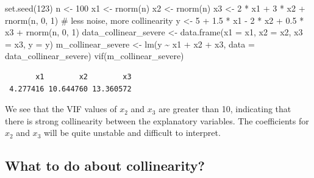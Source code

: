 \documentclass[
  letterpaper,
  8pt,
  a4paper]{book}
\newenvironment{Shaded}{\begin{snugshade}}{\end{snugshade}}
\newcommand{\AttributeTok}[1]{\textcolor[rgb]{0.40,0.45,0.13}{#1}}
\newcommand{\CommentTok}[1]{\textcolor[rgb]{0.37,0.37,0.37}{#1}}
\newcommand{\DecValTok}[1]{\textcolor[rgb]{0.68,0.00,0.00}{#1}}
\newcommand{\FloatTok}[1]{\textcolor[rgb]{0.68,0.00,0.00}{#1}}
\newcommand{\FunctionTok}[1]{\textcolor[rgb]{0.28,0.35,0.67}{#1}}
\newcommand{\NormalTok}[1]{\textcolor[rgb]{0.00,0.23,0.31}{#1}}
\newcommand{\OtherTok}[1]{\textcolor[rgb]{0.00,0.23,0.31}{#1}}
\newcommand{\SpecialCharTok}[1]{\textcolor[rgb]{0.37,0.37,0.37}{#1}}
\begin{document}
\begin{Shaded}
\begin{Highlighting}[]
\FunctionTok{set.seed}\NormalTok{(}\DecValTok{123}\NormalTok{)}
\NormalTok{n }\OtherTok{\textless{}{-}} \DecValTok{100}
\NormalTok{x1 }\OtherTok{\textless{}{-}} \FunctionTok{rnorm}\NormalTok{(n)}
\NormalTok{x2 }\OtherTok{\textless{}{-}} \FunctionTok{rnorm}\NormalTok{(n)}
\NormalTok{x3 }\OtherTok{\textless{}{-}} \DecValTok{2} \SpecialCharTok{*}\NormalTok{ x1 }\SpecialCharTok{+} \DecValTok{3} \SpecialCharTok{*}\NormalTok{ x2 }\SpecialCharTok{+} \FunctionTok{rnorm}\NormalTok{(n, }\DecValTok{0}\NormalTok{, }\DecValTok{1}\NormalTok{)  }\CommentTok{\# less noise, more collinearity}
\NormalTok{y }\OtherTok{\textless{}{-}} \DecValTok{5} \SpecialCharTok{+} \FloatTok{1.5} \SpecialCharTok{*}\NormalTok{ x1 }\SpecialCharTok{{-}} \DecValTok{2} \SpecialCharTok{*}\NormalTok{ x2 }\SpecialCharTok{+} \FloatTok{0.5} \SpecialCharTok{*}\NormalTok{ x3 }\SpecialCharTok{+} \FunctionTok{rnorm}\NormalTok{(n, }\DecValTok{0}\NormalTok{, }\DecValTok{1}\NormalTok{)}
\NormalTok{data\_collinear\_severe }\OtherTok{\textless{}{-}} \FunctionTok{data.frame}\NormalTok{(}\AttributeTok{x1 =}\NormalTok{ x1, }\AttributeTok{x2 =}\NormalTok{ x2, }\AttributeTok{x3 =}\NormalTok{ x3, }\AttributeTok{y =}\NormalTok{ y)}
\NormalTok{m\_collinear\_severe }\OtherTok{\textless{}{-}} \FunctionTok{lm}\NormalTok{(y }\SpecialCharTok{\textasciitilde{}}\NormalTok{ x1 }\SpecialCharTok{+}\NormalTok{ x2 }\SpecialCharTok{+}\NormalTok{ x3, data}
 \OtherTok{=}\NormalTok{ data\_collinear\_severe)}
\FunctionTok{vif}\NormalTok{(m\_collinear\_severe)}
\end{Highlighting}
\end{Shaded}

\begin{verbatim}
       x1        x2        x3 
 4.277416 10.644760 13.360572 
\end{verbatim}

We see that the VIF values of \(x_2\) and \(x_3\) are greater than 10,
indicating that there is strong collinearity between the explanatory
variables. The coefficients for \(x_2\) and \(x_3\) will be quite
unstable and difficult to interpret.

\subsection*{What to do about
collinearity?}\label{what-to-do-about-collinearity}
\end{document}
